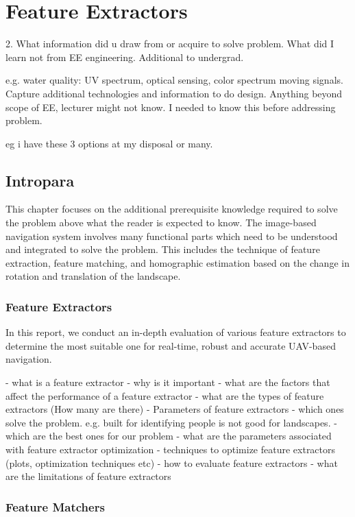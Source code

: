 \chapter{Feature Extractors}


2. What information did u draw from or acquire to solve problem. What did I learn not from EE engineering. Additional to undergrad. 

e.g. water quality: UV spectrum, optical sensing, color spectrum moving signals. Capture additional technologies and information to do design. Anything beyond scope of EE, lecturer might not know. I needed to know this before addressing problem. 

eg i have these 3 options at my disposal or many. 

\section{Intropara}

This chapter focuses on the additional prerequisite knowledge required to solve the problem above what the reader is expected to know. The image-based navigation system involves many functional parts which need to be understood and integrated to solve the problem. This includes the technique of feature extraction, feature matching, and homographic estimation based on the change in rotation and translation of the landscape. 

\subsection*{Feature Extractors}
In this report, we conduct an in-depth evaluation of various feature extractors to determine the most suitable one for real-time, robust and accurate UAV-based navigation. 


- what is a feature extractor   
- why is it important
- what are the factors that affect the performance of a feature extractor 
- what are the types of feature extractors (How many are there)
- Parameters of feature extractors
- which ones solve the problem. e.g. built for identifying people is not good for landscapes. 
- which are the best ones for our problem
- what are the parameters associated with feature extractor optimization 
- techniques to optimize feature extractors (plots, optimization techniques etc)
- how to evaluate feature extractors
- what are the limitations of feature extractors


\subsection{Feature Matchers}

